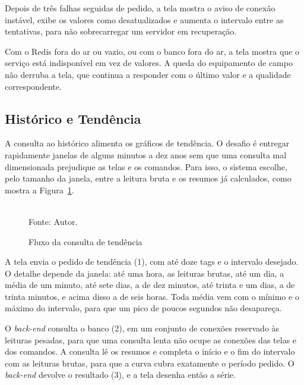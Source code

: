 \par Depois de três falhas seguidas de pedido, a tela mostra o aviso de conexão instável, exibe os valores como desatualizados e aumenta o intervalo entre as tentativas, para não sobrecarregar um servidor em recuperação.

\par Com o Redis fora do ar ou vazio, ou com o banco fora do ar, a tela mostra que o serviço está indisponível em vez de valores. A queda do equipamento de campo não derruba a tela, que continua a responder com o último valor e a qualidade correspondente.

\subsection{Histórico e Tendência}

\par A consulta ao histórico alimenta os gráficos de tendência. O desafio é entregar rapidamente janelas de alguns minutos a dez anos sem que uma consulta mal dimensionada prejudique as telas e os comandos. Para isso, o sistema escolhe, pelo tamanho da janela, entre a leitura bruta e os resumos já calculados, como mostra a Figura~\ref{fig:fx_tendencia}.

\begin{figure}[H]
    \centering
    \caption{Fluxo da consulta de tendência}
    \label{fig:fx_tendencia}
    \vspace{0.4cm}
    \vspace{0.2cm} \\
    Fonte: Autor.
\end{figure}

\par A tela envia o pedido de tendência (1), com até doze tags e o intervalo desejado. O detalhe depende da janela: até uma hora, as leituras brutas, até um dia, a média de um minuto, até sete dias, a de dez minutos, até trinta e um dias, a de trinta minutos, e acima disso a de seis horas. Toda média vem com o mínimo e o máximo do intervalo, para que um pico de poucos segundos não desapareça.

\par O \emph{back-end} consulta o banco (2), em um conjunto de conexões reservado às leituras pesadas, para que uma consulta lenta não ocupe as conexões das telas e dos comandos. A consulta lê os resumos e completa o início e o fim do intervalo com as leituras brutas, para que a curva cubra exatamente o período pedido. O \emph{back-end} devolve o resultado (3), e a tela desenha então a série.

